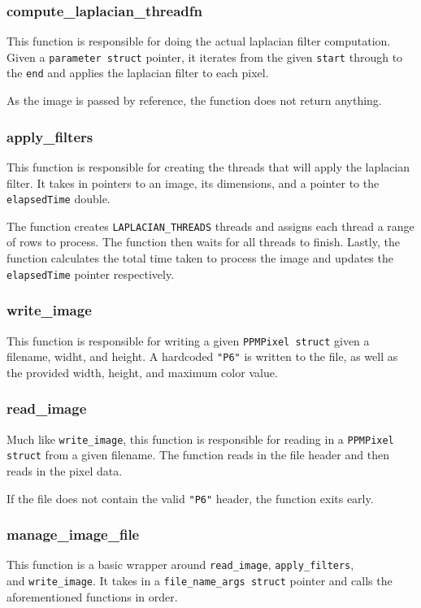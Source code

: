 \documentclass{article}
\begin{document}
\subsubsection{compute\_laplacian\_threadfn}
This function is responsible for doing the actual laplacian filter computation.
Given a \texttt{parameter struct} pointer, it iterates from the given \texttt{start}
through to the \texttt{end} and applies the laplacian filter to each pixel.

As the image is passed by reference, the function does not return anything.

\subsubsection{apply\_filters}
This function is responsible for creating the threads that will apply the laplacian
filter. It takes in pointers to an image, its dimensions, and a pointer to
the \texttt{elapsedTime} double.

The function creates \texttt{LAPLACIAN\_THREADS} threads and assigns each thread
a range of rows to process. The function then waits for all threads to finish.
Lastly, the function calculates the total time taken to process the image and
updates the \texttt{elapsedTime} pointer respectively.

\subsubsection{write\_image}
This function is responsible for writing a given \texttt{PPMPixel struct} given
a filename, widht, and height. A hardcoded \texttt{"P6"} is written to the file,
as well as the provided width, height, and maximum color value.

\subsubsection{read\_image}
Much like \texttt{write\_image}, this function is responsible for reading in
a \texttt{PPMPixel struct} from a given filename. The function reads in the
file header and then reads in the pixel data.

If the file does not contain the valid \texttt{"P6"} header, the function
exits early.

\subsubsection{manage\_image\_file}
This function is a basic wrapper around \texttt{read\_image},
\texttt{apply\_filters}, \\
and \texttt{write\_image}. It takes in a \texttt{file\_name\_args struct}
pointer and calls the aforementioned functions in order.
\end{document}
